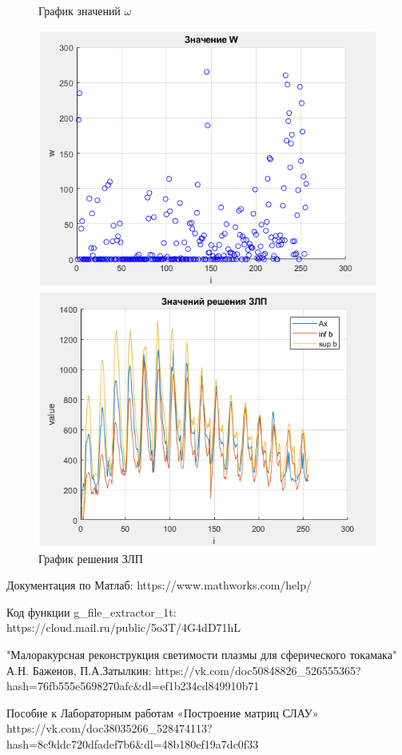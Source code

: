 \documentclass[a4]{article}
\begin{document}
\begin{figure}[H]
\begin{center}
\caption{График значений $\omega$}
\includegraphics{pic3.png} 
\caption{График решения ЗЛП}
\includegraphics{pic4.png}
\end{center}
\end{figure}



\begin{thebibliography}{}
      Документация по Матлаб: https://www.mathworks.com/help/

     Код функции g\_file\_extractor\_1t: https://cloud.mail.ru/public/5o3T/4G4dD71hL
    
   "Малоракурсная реконструкция светимости плазмы для сферического токамака" А.Н. Баженов, П.А.Затылкин: https://vk.com/doc50848826\_526555365?hash=76fb555e5698270afc\&dl=ef1b234cd849910b71
    
    Пособие к Лабораторным работам «Построение матриц СЛАУ» https://vk.com/doc38035266\_528474113?hash=8c9ddc720dfadef7b6\&dl=48b180ef19a7dc0f33
    
    
\end{thebibliography}
\end{document}
